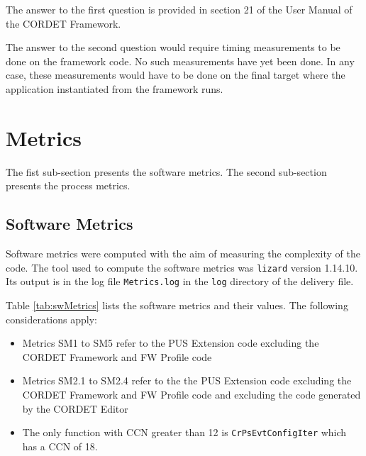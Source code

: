 \documentclass{pnp_article}
\begin{document}
The answer to the first question is provided in section 21 of the User Manual of the CORDET Framework.

The answer to the second question would require timing measurements to be done on the framework code. No such measurements have yet been done. In any case, these measurements would have to be done on the final target where the application instantiated from the framework runs. 



\section{Metrics}\label{sec:svrMetrics}
The fist sub-section presents the software metrics. The second sub-section presents the process metrics.

\subsection{Software Metrics}\label{sec:svrSwMetrics}
Software metrics were computed with the aim of measuring the complexity of the code. The tool used to compute the software metrics was \texttt{lizard} version 1.14.10. Its output is in the log file \texttt{Metrics.log} in the \texttt{log} directory of the delivery file.

Table \ref{tab:swMetrics} lists the software metrics and their values. The following considerations apply:

\begin{itemize}
\item Metrics SM1 to SM5 refer to the PUS Extension code excluding the CORDET Framework and FW Profile code
\item Metrics SM2.1 to SM2.4 refer to the the PUS Extension code excluding the CORDET Framework and FW Profile code and excluding the code generated by the CORDET Editor
\item The only function with CCN greater than 12 is \texttt{CrPsEvtConfigIter} which has a CCN of 18.
\end{itemize}
\end{document}
